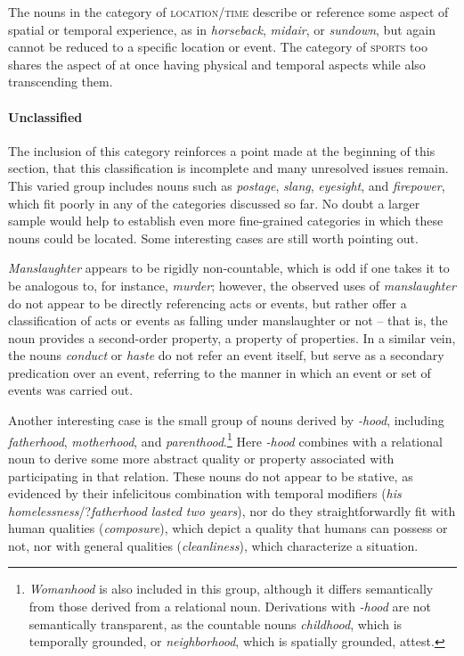 \documentclass[output=paper]{langscibook}
\begin{document}
The nouns in the category of \textsc{location/time} describe or reference some aspect of spatial or temporal experience, as in \textit{horseback},  \textit{midair}, or \textit{sundown}, but again cannot be reduced to a specific location or event.  The category of \textsc{sports} too shares the aspect of at once having physical and temporal aspects while also transcending them.  


\paragraph*{Unclassified}  The inclusion of this category  reinforces a point made at the beginning of this section, that this classification is incomplete and many unresolved issues remain.  This varied group  includes nouns such as \textit{postage}, \textit{slang}, \textit{eyesight}, and \textit{firepower}, which fit poorly in any of the categories discussed so far.  No doubt a larger sample would help to establish even more fine-grained categories in which these nouns could be located.  Some interesting cases are still worth pointing out.  

\textit{Manslaughter} appears to be rigidly non-countable, which is odd if one takes it to be analogous to, for instance, \textit{murder}; however, the observed uses of \textit{manslaughter} do not appear to be directly referencing acts or events, but rather offer a classification of acts or events as falling under manslaughter or not -- that is, the noun provides a second-order property, a property of properties. In a similar vein, the nouns \textit{conduct} or \textit{haste} do not refer an event itself, but serve as a secondary predication over an event, referring to the manner in which an event or set of events was carried out.





Another interesting case is the small group of nouns derived by \textit{-hood}, including \textit{fatherhood}, \textit{motherhood}, and \textit{parenthood}.\footnote{\textit{Womanhood} is also included in this group, although it differs semantically from those derived from a relational noun.  Derivations with \textit{-hood} are not semantically transparent, as the countable nouns \textit{childhood}, which is temporally grounded, or \textit{neighborhood}, which is spatially grounded, attest.}  Here \textit{-hood} combines with a relational noun to derive some more abstract quality or property associated with participating in that relation.  These nouns do not appear to be stative, as evidenced by their infelicitous combination with temporal modifiers (\textit{his homelessness}/?\textit{fatherhood lasted two years}), nor do they straightforwardly fit with human qualities (\textit{composure}), which depict a quality that humans can possess or not, nor with general qualities (\textit{cleanliness}), which characterize a situation. %
\end{document}
